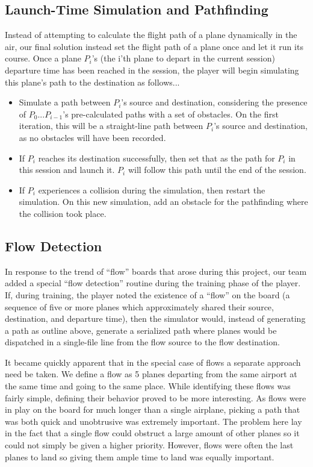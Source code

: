 \documentclass[10pt]{article}
\begin{document}
\subsection{Launch-Time Simulation and Pathfinding}
Instead of attempting to calculate the flight path of a plane dynamically in the air, our final
solution instead set the flight path of a plane once and let it run its course. Once a plane $P_i$'s 
(the i'th plane to depart in the current session)  departure time has been reached in the session, 
the player will begin simulating this plane's path to the destination as follows...
\begin{itemize}
  \item Simulate a path between $P_i$'s source and destination, considering the presence of 
    $P_0$...$P_{i-1}$'s pre-calculated paths with a set of obstacles. On the first iteration, 
    this will be a straight-line path between $P_i$'s source and destination, as no obstacles
    will have been recorded.
  \item If $P_i$ reaches its destination successfully, then set that as the path for $P_i$ in this
    session and launch it. $P_i$ will follow this path until the end of the session.
  \item If $P_i$ experiences a collision during the simulation, then restart the simulation. On this new
    simulation, add an obstacle for the pathfinding where the collision took place.
\end{itemize}

\subsection{Flow Detection}
In response to the trend of ``flow'' boards that arose during this project, our team added a special
``flow detection'' routine during the training phase of the player. If, during training, the player noted
the existence of a ``flow'' on the board (a sequence of five or more planes which approximately shared 
their source, destination, and departure time), then the simulator would, instead of generating a path
as outline above, generate a serialized path where planes would be dispatched in a single-file line
from the flow source to the flow destination.

It became quickly apparent that in the special case of flows a separate approach need be taken. We define a flow as 5 planes departing from the same airport at the same time and going to the same place. While identifying these flows was fairly simple, defining their behavior proved to be more interesting. As flows were in play on the board for much longer than a single airplane, picking a path that was both quick and unobtrusive was extremely important. The problem here lay in the fact that a single flow could obstruct a large amount of other planes so it could not simply be given a higher priority. However, flows were often the last planes to land so giving them ample time to land was equally important.
\end{document}
